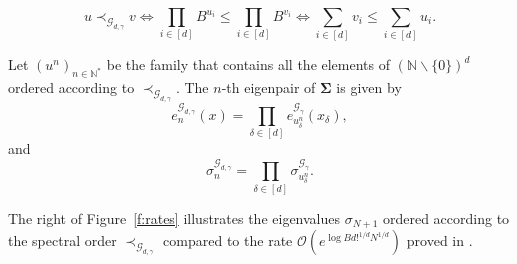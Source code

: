 \documentclass[twoside,11pt]{book}
\numberwithin{theorem}{chapter}
\numberwithin{definition}{chapter}
\numberwithin{proposition}{chapter}
\numberwithin{corollary}{chapter}
\numberwithin{example}{chapter}
\numberwithin{lemma}{chapter}
\numberwithin{assumption}{chapter}
\numberwithin{equation}{chapter}
\numberwithin{figure}{chapter}
\DeclareMathOperator{\Tran}{\intercal}
\DeclareMathOperator{\X}{\mathcal{X}}
\begin{document}
\begin{equation}
u \prec_{\mathcal{G}_{d,\gamma}} v   \iff \prod\limits_{i \in [d]} B^{u_{i}}  \leq \prod\limits_{i \in [d]} B^{v_{i}}  \iff \sum\limits_{i \in [d]} v_{i}   \leq \sum\limits_{i \in [d]} u_{i} .
\label{e:orderGaussian}
\end{equation}

Let $(u^{n})_{n \in \mathbb{N}^{*}}$ be the family that contains all the elements of $(\mathbb{N} \smallsetminus \{0\})^d$  ordered according to $\prec_{\mathcal{G}_{d,\gamma}}$. The $n$-th eigenpair of $\bm{\Sigma}$ is given by
\begin{equation}
e_{n}^{\mathcal{G}_{d,\gamma}}(x) = \prod\limits_{\delta \in [d]} e_{u_{\delta}^{n}}^{\mathcal{G}_{\gamma}}(x_{\delta}),
\end{equation}
and
\begin{equation}
\sigma_{n}^{\mathcal{G}_{d,\gamma}} = \prod\limits_{\delta \in [d]} \sigma_{u_{\delta}^{n}}^{\mathcal{G}_{\gamma}}.
\end{equation}

The right of Figure~\ref{f:rates} illustrates the eigenvalues $\sigma_{N+1}$ ordered according to the spectral order $\prec_{\mathcal{G}_{d,\gamma}}$ compared to the rate $\mathcal{O}(e^{\log B d!^{1/d} N^{1/d}})$ proved in \parencite{Bac17}.




\end{document}
